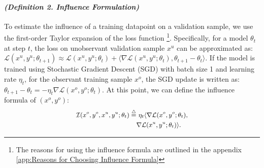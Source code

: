 \paragraph{\textit{(Definition 2. Influence Formulation)}}
To estimate the influence of a training datapoint on a validation sample, we use the first-order Taylor expansion of the loss function \cite{Pruthi_Liu_Kale_Sundararajan_2020}\footnote{The reasons for using the influence formula are outlined in the appendix \ref{app:Reasons for Choosing Influence Formula}}. Specifically, for a model $\theta_t$ at step $t$, the loss on unobservant validation sample $x^{u}$ can be approximated as:
$
\mathcal{L}(x^{u},y^{u}; \theta_{t+1}) \approx \mathcal{L}(x^{u},y^{u}; \theta_t) + \langle \nabla \mathcal{L}(x^{u},y^{u}; \theta_t), \theta_{t+1} - \theta_t \rangle.
$
If the model is trained using Stochastic Gradient Descent (SGD) with batch size 1 and learning rate $\eta_t$, for the observant training sample $x^o$, the SGD update is written as:
$
\theta_{t+1} - \theta_t = -\eta_t \nabla \mathcal{L}(x^{o},y^{o}; \theta_t).
$
At this point, we can define the influence formula of $(x^{o},y^{o})$:
\begin{equation}
\small
\label{eq:influence_equation}
\begin{aligned}
\mathcal{I}(x^{o},y^{o},x^{u},y^{u}; \theta_{t}) \stackrel{\triangle}{=} & ~ \eta_t \langle \nabla \mathcal{L}(x^{o},y^{o}; \theta_t), \\ \quad \quad
& \nabla \mathcal{L}(x^{u},y^{u}; \theta_t) \rangle.
\end{aligned}
\end{equation}

